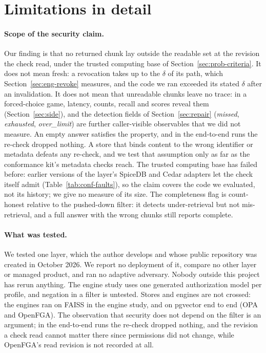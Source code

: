 
\section{Limitations in detail}\label{sec:limits-limits}

\paragraph{Scope of the security claim.}
Our finding is that no returned chunk lay outside the readable set at the revision
the check read, under the trusted computing base of Section~\ref{sec:prob-criteria}. It does not mean
fresh: a revocation takes up to the $\delta$ of its path, which Section~\ref{sec:eng-revoke} measures,
and the code we ran exceeded its stated $\delta$ after an invalidation. It does not mean that
unreadable chunks leave no trace: in a forced-choice game, latency, counts, recall and scores reveal them
(Section~\ref{sec:side}), and the detection fields of Section~\ref{sec:repair} (\emph{missed},
\emph{exhausted}, \emph{over\_limit}) are further caller-visible observables that we did not measure. An empty answer satisfies the property, and in the end-to-end runs the re-check dropped nothing. A
store that binds content to the wrong identifier or metadata defeats any re-check, and we test that
assumption only as far as the conformance kit's metadata checks reach. The trusted computing base has
failed before: earlier versions of the layer's SpiceDB and Cedar adapters let the check itself admit
(Table~\ref{tab:conf-faults}), so the claim covers the code we evaluated, not its history; we give no measure of its size. The
completeness flag is count-honest relative to the pushed-down filter: it detects under-retrieval but
not mis-retrieval, and a full answer with the wrong chunks still reports complete.

\paragraph{What was tested.}
We tested one layer, which the author develops and whose public repository was created in October 2026. We report no deployment of it, compare no other layer or managed product, and ran no adaptive adversary. Nobody outside this project has rerun anything. The engine study uses one generated authorization model per profile, and negation in a filter is untested. Stores and engines are not crossed: the engines ran on FAISS in the engine study, and on pgvector end to end (OPA and OpenFGA). The observation that security does not depend on the filter is an argument; in the end-to-end runs the re-check dropped nothing, and the revision a check read cannot matter there since permissions did not change, while OpenFGA's read revision is not recorded at all.

